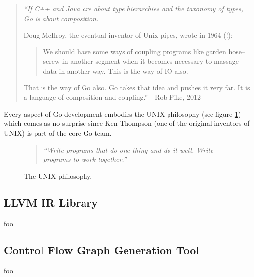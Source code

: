 \begin{quote}
	\itshape
	``If C++ and Java are about type hierarchies and the taxonomy of types, Go is about composition.

	Doug McIlroy, the eventual inventor of Unix pipes, wrote in 1964 (!):

	\begin{quote}
		We should have some ways of coupling programs like garden hose--screw in another segment when it becomes necessary to massage data in another way. This is the way of IO also.
	\end{quote}

	That is the way of Go also. Go takes that idea and pushes it very far. It is a language of composition and coupling.''
	\normalfont
	- Rob Pike, 2012 \cite{less_is_more}
\end{quote}

Every aspect of Go development embodies the UNIX philosophy (see figure \ref{fig:unix_philosophy}) which comes as no surprise since Ken Thompson (one of the original inventors of UNIX) is part of the core Go team.

\begin{figure}[htbp]
	\begin{center}
		\begin{quote}
			\textit{``Write programs that do one thing and do it well. Write programs to work together.''} \cite{art_of_unix}
		\end{quote}
		\caption{The UNIX philosophy.}
		\label{fig:unix_philosophy}
	\end{center}
\end{figure}


\subsection{LLVM IR Library}

foo


\subsection{Control Flow Graph Generation Tool}

foo


